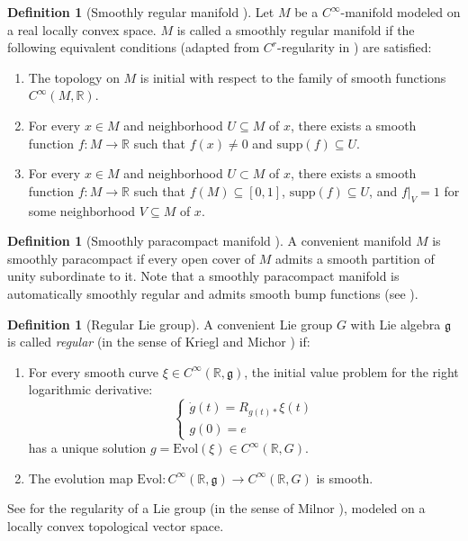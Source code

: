 \documentclass[11pt,reqno]{amsart}
\theoremstyle{definition}
\newtheorem{definition}[theorem]{Definition}
\numberwithin{equation}{section}
\begin{document}
\begin{definition}[Smoothly regular manifold {\cite[Definition 3.5.30]{11}}]
Let $M$ be a $C^{\infty}$-manifold modeled on a real locally convex space. $M$ is called a smoothly regular manifold if the following equivalent conditions (adapted from $C^{r}$-regularity in \cite[Proposition 3.5.29]{11}) are satisfied:
\begin{enumerate}
    \item[(a)] The topology on $M$ is initial with respect to the family of smooth functions $C^{\infty}(M, \mathbb{R})$.
    \item[(b)] For every $x \in M$ and neighborhood $U \subseteq M$ of $x$, there exists a smooth function $f: M \rightarrow \mathbb{R}$ such that $f(x) \neq 0$ and $\text{supp}(f) \subseteq U$.
    \item[(c)] For every $x \in M$ and neighborhood $U \subset M$ of $x$, there exists a smooth function $f: M \rightarrow \mathbb{R}$ such that $f(M) \subseteq [0, 1]$, $\text{supp}(f) \subseteq U$, and $f|_{V} = 1$ for some neighborhood $V \subseteq M$ of $x$.
\end{enumerate}
\end{definition}

\begin{definition}[Smoothly paracompact manifold {\cite[27.4]{20}}]
A convenient manifold $M$ is smoothly paracompact if every open cover of $M$ admits a smooth partition of unity subordinate to it. Note that a smoothly paracompact manifold is automatically smoothly regular and admits smooth bump functions (see \cite[16.10]{20}).
\end{definition}

\begin{definition}[Regular Lie group]
A convenient Lie group $G$ with Lie algebra $\mathfrak{g}$ is called \textit{regular} (in the sense of Kriegl and Michor \cite[38.4]{20}) if:
\begin{enumerate}
    \item For every smooth curve $\xi \in C^{\infty}(\mathbb{R}, \mathfrak{g})$, the initial value problem for the right logarithmic derivative:
    \[
    \begin{cases}
    \dot{g}(t) = R_{g(t)*}\xi(t) \\
    g(0) = e
    \end{cases}
    \]
    has a unique solution $g = \text{Evol}(\xi) \in C^{\infty}(\mathbb{R}, G)$.
    \item The evolution map $\text{Evol}: C^{\infty}(\mathbb{R}, \mathfrak{g}) \rightarrow C^{\infty}(\mathbb{R}, G)$ is smooth.
\end{enumerate}
See \cite[Definition 6.1]{11} for the regularity of a Lie group (in the sense of Milnor \cite{25}), modeled on a locally convex topological vector space.
\end{definition}
\end{document}
